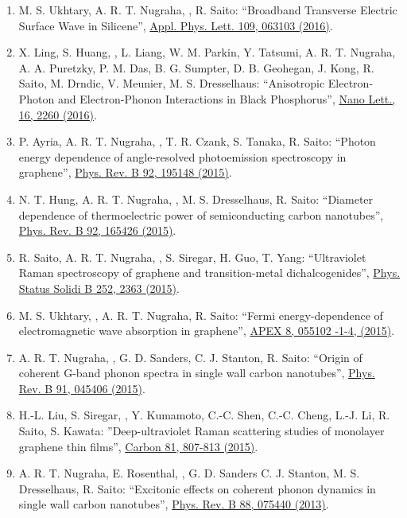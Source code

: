 \begin{enumerate}
\item M. S. Ukhtary, A. R. T. Nugraha, \hes, R. Saito: ``Broadband
  Transverse Electric Surface Wave in Silicene'',
  \href{http://dx.doi.org/10.1063/1.4960531}{Appl. Phys. Lett. 109,
    063103 (2016)}.
\item X. Ling, S. Huang, \hes, L. Liang, W. M. Parkin, Y. Tatsumi,
  A. R. T. Nugraha, A. A. Puretzky, P. M. Das, B. G. Sumpter,
  D. B. Geohegan, J. Kong, R. Saito, M. Drndic, V. Meunier,
  M. S. Dresselhaus: ``Anisotropic Electron-Photon and Electron-Phonon
  Interactions in Black Phosphorus'',
  \href{http://dx.doi.org/10.1021/acs.nanolett.5b04540} {Nano Lett.,
    16, 2260 (2016)}.
\item P. Ayria, A. R. T. Nugraha, \hes, T. R. Czank, S. Tanaka, R. Saito:
``Photon energy dependence of angle-resolved photoemission spectroscopy in graphene'', \href{http://dx.doi.org/10.1103/PhysRevB.92.195148} {Phys. Rev. B 92, 195148 (2015)}. 
\item N. T. Hung, A. R. T. Nugraha, \hes, M. S. Dresselhaus, R. Saito:
  ``Diameter dependence of thermoelectric power of semiconducting
  carbon nanotubes'', \href{http://dx.doi.org/10.1103/PhysRevB.92.165426}
  {Phys. Rev. B 92, 165426 (2015)}.
\item R. Saito, A. R. T. Nugraha, \hes, S. Siregar, H. Guo, T. Yang:
  ``Ultraviolet Raman spectroscopy of graphene and transition-metal
  dichalcogenides'', \href{http://dx.doi.org/10.1002/pssb.201552201}
  {Phys. Status Solidi B 252, 2363 (2015)}.
\item M. S. Ukhtary, \hes, A. R. T. Nugraha, R. Saito: ``Fermi
  energy-dependence of electromagnetic wave absorption in graphene'',
  \href{http://dx.doi.org/10.7567/APEX.8.055102} {APEX 8, 055102 -1-4,
    (2015)}. 
\item A. R. T. Nugraha, \hes, G. D. Sanders, C. J. Stanton, R. Saito:
  ``Origin of coherent G-band phonon spectra in single wall carbon
  nanotubes'', \href{http://dx.doi.org/10.1103/PhysRevB.91.045406}
  {Phys. Rev. B 91, 045406 (2015)}.  

  \item H.-L. Liu, S. Siregar, \hes, Y. Kumamoto, C.-C. Shen,
    C.-C. Cheng, L.-J. Li, R. Saito, S. Kawata: ''Deep-ultraviolet
    Raman scattering studies of monolayer graphene thin films'',
    \href{http://dx.doi.org/j.carbon.2014.10.028}{Carbon 81, 807-813
      (2015)}.
\item A. R. T. Nugraha, E. Rosenthal, \hes,
  G. D. Sanders C. J. Stanton, M. S. Dresselhaus, R. Saito:
  ``Excitonic effects on coherent phonon dynamics in single wall
  carbon nanotubes'',
  \href{http://dx.doi.org/10.1103/PhysRevB.88.075440}{ Phys.
      Rev. B 88, 075440 (2013)}.
\end{enumerate}
 \vspace*{\baselineskip}
